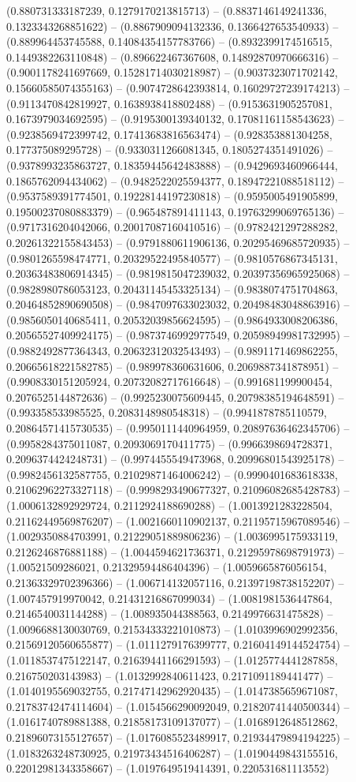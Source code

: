 (0.880731333187239, 0.1279170213815713) -- (0.8837146149241336, 0.1323343268851622) -- (0.8867909094132336, 0.1366427653540933) -- (0.889964453745588, 0.14084354157783766) -- (0.8932399174516515, 0.1449382263110848) -- (0.896622467367608, 0.14892870970666316) -- (0.9001178241697669, 0.15281714030218987) -- (0.9037323071702142, 0.15660585074355163) -- (0.9074728642393814, 0.16029727239174213) -- (0.9113470842819927, 0.1638938418802488) -- (0.9153631905257081, 0.1673979034692595) -- (0.9195300139340132, 0.17081161158543623) -- (0.9238569472399742, 0.17413683816563474) -- (0.928353881304258, 0.177375089295728) -- (0.9330311266081345, 0.1805274351491026) -- (0.9378993235863727, 0.18359445642483888) -- (0.9429693460966444, 0.1865762094434062) -- (0.9482522025594377, 0.18947221088518112) -- (0.9537589391774501, 0.19228144197230818) -- (0.9595005491905899, 0.19500237080883379) -- (0.965487891411143, 0.19763299069765136) -- (0.9717316204042066, 0.20017087160410516) -- (0.9782421297288282, 0.20261322155843453) -- (0.9791880611906136, 0.20295469685720935) -- (0.9801265598474771, 0.20329522495840577) -- (0.9810576867345131, 0.20363483806914345) -- (0.9819815047239032, 0.20397356965925068) -- (0.9828980786053123, 0.20431145453325134) -- (0.9838074751704863, 0.20464852890690508) -- (0.9847097633023032, 0.20498483048863916) -- (0.9856050140685411, 0.20532039856624595) -- (0.9864933008206386, 0.20565527409924175) -- (0.9873746992977549, 0.20598949981732995) -- (0.9882492877364343, 0.20632312032543493) -- (0.9891171469862255, 0.20665618221582785) -- (0.989978360631606, 0.2069887341878951) -- (0.9908330151205924, 0.20732082717616648) -- (0.991681199900454, 0.2076525144872636) -- (0.9925230075609445, 0.20798385194648591) -- (0.993358533985525, 0.2083148980548318) -- (0.9941878785110579, 0.20864571415730535) -- (0.9950111440964959, 0.20897636462345706) -- (0.9958284375011087, 0.2093069170411775) -- (0.9966398694728371, 0.2096374424248731) -- (0.9974455549473968, 0.20996801543925178) -- (0.9982456132587755, 0.21029871464006242) -- (0.9990401683618338, 0.21062962273327118) -- (0.9998293490677327, 0.21096082685428783) -- (1.0006132892929724, 0.2112924188690288) -- (1.0013921283228504, 0.21162449569876207) -- (1.0021660110902137, 0.21195715967089546) -- (1.0029350884703991, 0.21229051889806236) -- (1.0036995175933119, 0.2126246876881188) -- (1.0044594621736371, 0.21295978698791973) -- (1.00521509286021, 0.21329594486404396) -- (1.0059665876056154, 0.21363329702396366) -- (1.006714132057116, 0.21397198738152207) -- (1.007457919970042, 0.21431216867099034) -- (1.0081981536447864, 0.2146540031144288) -- (1.008935044388563, 0.2149976631475828) -- (1.0096688130030769, 0.21534333221010873) -- (1.0103996902992356, 0.21569120560655877) -- (1.0111279176399777, 0.21604149144524754) -- (1.0118537475122147, 0.21639441166291593) -- (1.0125774441287858, 0.216750203143983) -- (1.0132992840611423, 0.2171091189441477) -- (1.0140195569032755, 0.21747142962920435) -- (1.0147385659671087, 0.21783742474114604) -- (1.0154566290092049, 0.21820741440500344) -- (1.0161740789881388, 0.21858173109137077) -- (1.0168912648512862, 0.21896073155127657) -- (1.0176085523489917, 0.21934479894194225) -- (1.0183263248730925, 0.21973434516406287) -- (1.0190449843155516, 0.22012981343358667) -- (1.0197649519414391, 0.220531681113552) 